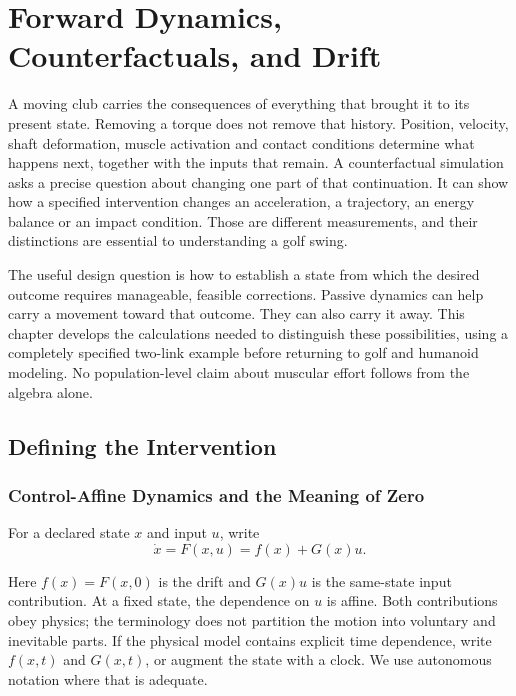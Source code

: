 \chapter[Forward Dynamics, Counterfactuals, and Drift]{Forward Dynamics,\\Counterfactuals, and Drift}
\label{ch:counterfactuals}

A moving club carries the consequences of everything that brought it to its present state. Removing a torque does not remove that history. Position, velocity, shaft deformation, muscle activation and contact conditions determine what happens next, together with the inputs that remain. A counterfactual simulation asks a precise question about changing one part of that continuation. It can show how a specified intervention changes an acceleration, a trajectory, an energy balance or an impact condition. Those are different measurements, and their distinctions are essential to understanding a golf swing.

The useful design question is how to establish a state from which the desired outcome requires manageable, feasible corrections. Passive dynamics can help carry a movement toward that outcome. They can also carry it away. This chapter develops the calculations needed to distinguish these possibilities, using a completely specified two-link example before returning to golf and humanoid modeling. No population-level claim about muscular effort follows from the algebra alone.

\section{Defining the Intervention}
\label{sec:ch7:intervention}

\subsection{Control-Affine Dynamics and the Meaning of Zero}
\label{def:ch7:drift}
\label{def:ch7:input}
For a declared state $x$ and input $u$, write
\begin{equation}
\dot x=F(x,u)=f(x)+G(x)u.
\label{eq:ch7:affine}
\end{equation}

Here $f(x)=F(x,0)$ is the drift and $G(x)u$ is the same-state input contribution. At a fixed state, the dependence on $u$ is affine. Both contributions obey physics; the terminology does not partition the motion into voluntary and inevitable parts. If the physical model contains explicit time dependence, write $f(x,t)$ and $G(x,t)$, or augment the state with a clock. We use autonomous notation where that is adequate.

